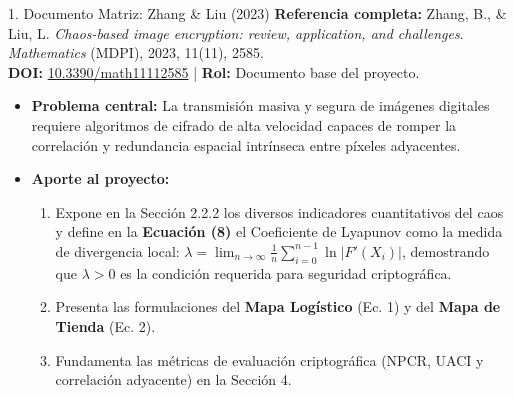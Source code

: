 \documentclass[11pt,letterpaper]{article}
\begin{document}
\begin{paperbox}{1. Documento Matriz: Zhang \& Liu (2023)}
\textbf{Referencia completa:} Zhang, B., \& Liu, L. \textit{Chaos-based image encryption: review, application, and challenges}. \textit{Mathematics} (MDPI), 2023, 11(11), 2585. \\
\textbf{DOI:} \href{https://doi.org/10.3390/math11112585}{10.3390/math11112585} \quad | \quad \textbf{Rol:} Documento base del proyecto.
\begin{itemize}
    \item \textbf{Problema central:} La transmisión masiva y segura de imágenes digitales requiere algoritmos de cifrado de alta velocidad capaces de romper la correlación y redundancia espacial intrínseca entre píxeles adyacentes.
    \item \textbf{Aporte al proyecto:} 
    \begin{enumerate}
        \item Expone en la Sección 2.2.2 los diversos indicadores cuantitativos del caos y define en la \textbf{Ecuación (8)} el Coeficiente de Lyapunov como la medida de divergencia local: $\lambda = \lim_{n \to \infty} \frac{1}{n} \sum_{i=0}^{n-1} \ln |F'(X_i)|$, demostrando que $\lambda > 0$ es la condición requerida para seguridad criptográfica.
        \item Presenta las formulaciones del \textbf{Mapa Logístico} (Ec. 1) y del \textbf{Mapa de Tienda} (Ec. 2).
        \item Fundamenta las métricas de evaluación criptográfica (NPCR, UACI y correlación adyacente) en la Sección 4.
    \end{enumerate}
\end{itemize}
\end{paperbox}
\end{document}
